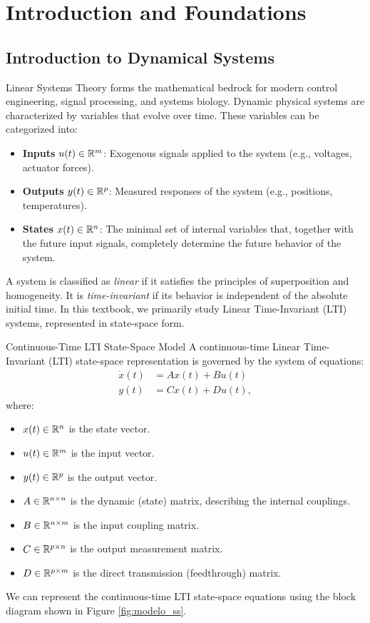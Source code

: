 \chapter{Introduction and Foundations}

\section{Introduction to Dynamical Systems}
Linear Systems Theory forms the mathematical bedrock for modern control engineering, signal processing, and systems biology. Dynamic physical systems are characterized by variables that evolve over time. These variables can be categorized into:
\begin{itemize}
    \item \textbf{Inputs} $u(t) \in \mathbb{R}^m$: Exogenous signals applied to the system (e.g., voltages, actuator forces).
    \item \textbf{Outputs} $y(t) \in \mathbb{R}^p$: Measured responses of the system (e.g., positions, temperatures).
    \item \textbf{States} $x(t) \in \mathbb{R}^n$: The minimal set of internal variables that, together with the future input signals, completely determine the future behavior of the system.
\end{itemize}

A system is classified as \textit{linear} if it satisfies the principles of superposition and homogeneity. It is \textit{time-invariant} if its behavior is independent of the absolute initial time. In this textbook, we primarily study Linear Time-Invariant (LTI) systems, represented in state-space form.

\begin{mydefinition}{Continuous-Time LTI State-Space Model}
A continuous-time Linear Time-Invariant (LTI) state-space representation is governed by the system of equations:
\begin{align}
    \dot{x}(t) &= A x(t) + B u(t) \label{eq:lti_state} \\
    y(t) &= C x(t) + D u(t) , \label{eq:lti_output}
\end{align}
where:
\begin{itemize}
    \item $x(t) \in \mathbb{R}^n$ is the state vector.
    \item $u(t) \in \mathbb{R}^m$ is the input vector.
    \item $y(t) \in \mathbb{R}^p$ is the output vector.
    \item $A \in \mathbb{R}^{n \times n}$ is the dynamic (state) matrix, describing the internal couplings.
    \item $B \in \mathbb{R}^{n \times m}$ is the input coupling matrix.
    \item $C \in \mathbb{R}^{p \times n}$ is the output measurement matrix.
    \item $D \in \mathbb{R}^{p \times m}$ is the direct transmission (feedthrough) matrix.
\end{itemize}
\end{mydefinition}
We can represent the continuous-time LTI state-space equations using the block diagram shown in Figure \ref{fig:modelo_ss}.

